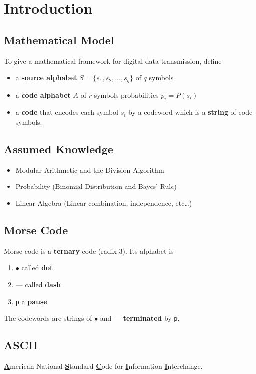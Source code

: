 \section{Introduction}

\subsection{Mathematical Model}
To give a mathematical framework for digital data transmission, define
\begin{itemize}
    \item a \textbf{source alphabet} \(S = \{s_1, s_2, \dots, s_q\}\) of \(q\) symbols
    \item a \textbf{code alphabet} \(A\) of \(r\) symbols probabilities \(p_i = P(s_i)\)
    \item a \textbf{code} that encodes each symbol \(s_i\) by a codeword which is a \textbf{string} of code symbols.
\end{itemize}

\subsection{Assumed Knowledge}
\begin{itemize}
    \item Modular Arithmetic and the Division Algorithm
    \item Probability (Binomial Distribution and Bayes' Rule)
    \item Linear Algebra (Linear combination, independence, etc\dots)
\end{itemize}

\subsection{Morse Code}
Morse code is a \textbf{ternary} code (radix 3). Its alphabet is
\begin{enumerate}
    \item $\bullet$ called \textbf{dot}
    \item --- called \textbf{dash}
    \item \texttt{p} a \textbf{pause}
\end{enumerate}
The codewords are strings of $\bullet$ and --- \textbf{terminated} by \texttt{p}.

\subsection{ASCII}
\textbf{\underline{A}}merican National \textbf{\underline{S}}tandard \textbf{\underline{C}}ode for \textbf{\underline{I}}nformation \textbf{\underline{I}}nterchange. \\

